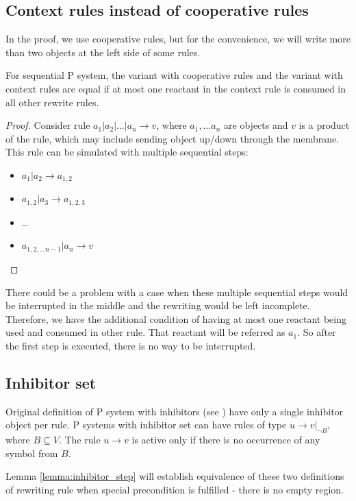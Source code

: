 \subsection{Context rules instead of cooperative rules}
  In the proof, we use cooperative rules, but for the convenience, we will write more than two objects at the left side of some rules.
  \begin{lemma}
  \label{lemma:context_rules}
    For sequential P system, the variant with cooperative rules and the variant with context rules are equal if at most one reactant in the context rule is consumed in all other rewrite rules.
  \end{lemma}
  \begin{proof}
    Consider rule $a_1|a_2|\dots|a_n \rightarrow v$, where $a_1,\dots a_n$ are objects and $v$ is a product of the rule, which may include sending object up/down through the membrane.
    This rule can be simulated with multiple sequential steps:
    \begin{itemize}
      \item $a_1|a_2 \rightarrow a_{1,2}$
      \item $a_{1,2}|a_3 \rightarrow a_{1,2,3}$
      \item \dots
      \item $a_{1,2,\dots n-1}|a_n \rightarrow v$
    \end{itemize}    
  \end{proof}
  There could be a problem with a case when these multiple sequential steps would be interrupted in the middle and the rewriting would be left incomplete. Therefore, we have the additional condition of having at most one reactant being used and consumed in other rule. That reactant will be referred as $a_1$. So after the first step is executed, there is no way to be interrupted.

\subsection{Inhibitor set}
Original definition of P system with inhibitors (see \cite{Ionescu:jucs_10_5:on_p_systems_with}) have only a single inhibitor object per rule. P systems with inhibitor set can have rules of type $u\rightarrow v|_{\neg B}$, where $B\subseteq V$. The rule $u\rightarrow v$ is active only if there is no occurrence of any symbol from $B$.

Lemma \ref{lemma:inhibitor_step} will establish equivalence of these two definitions of rewriting rule when special precondition is fulfilled - there is no empty region.


